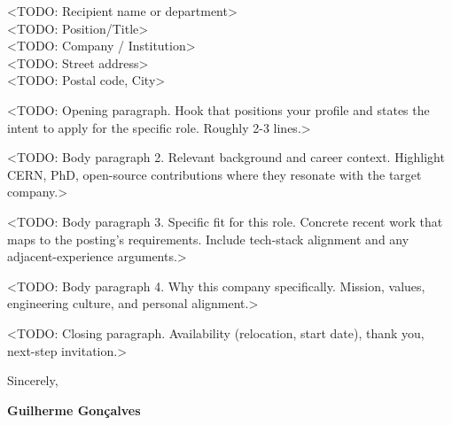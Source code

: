 \documentclass[11pt,a4paper]{article}
\begin{document}
{\color{SlateGrey}
<TODO: Recipient name or department>\\
<TODO: Position/Title>\\
<TODO: Company / Institution>\\
<TODO: Street address>\\
<TODO: Postal code, City>
}

\vspace{1.25em}



\vspace{1em}




<TODO: Opening paragraph. Hook that positions your profile and states the intent to apply for the specific role. Roughly 2-3 lines.>

<TODO: Body paragraph 2. Relevant background and career context. Highlight CERN, PhD, open-source contributions where they resonate with the target company.>

<TODO: Body paragraph 3. Specific fit for this role. Concrete recent work that maps to the posting's requirements. Include tech-stack alignment and any adjacent-experience arguments.>

<TODO: Body paragraph 4. Why this company specifically. Mission, values, engineering culture, and personal alignment.>

<TODO: Closing paragraph. Availability (relocation, start date), thank you, next-step invitation.>

\vspace{1em}

\closing{Sincerely,}

\vspace{2em}

\textbf{Guilherme Gonçalves}
\end{document}
